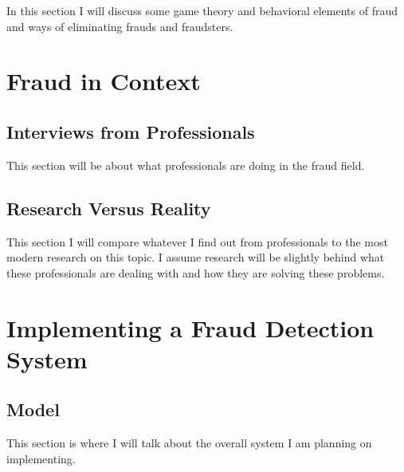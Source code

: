 \documentclass[midd]{thesis}
\begin{document}
In this section I will discuss some game theory and behavioral elements of fraud and ways of eliminating frauds and fraudsters.



\noindent
%
%

\pagebreak
\chapter{ Fraud in Context}
\label{sec:context}

\section{ Interviews from Professionals}

This section will be about what professionals are doing in the fraud field.

\section{ Research Versus Reality}

This section I will compare whatever I find out from professionals to the most modern research on this topic. I assume research will be slightly behind what these professionals are dealing with and how they are solving these problems.


\pagebreak
\chapter{Implementing a Fraud Detection System}
\label{sec:impl}


\section{Model}

This section is where I will talk about the overall system I am planning on implementing.
\end{document}
